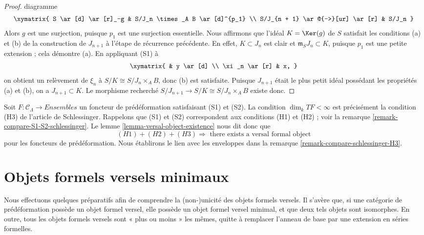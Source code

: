 \begin{proof}
diagramme
$$
\xymatrix{
S \ar[d] \ar[r]_-g  &  S/J_n \times_A B \ar[d]^{p_1} \\
S/J_{n + 1} \ar@{-->}[ur] \ar[r] &  S/J_n
}
$$
Alors $g$ est une surjection, puisque $p_1$ est une surjection essentielle.
Nous affirmons que l'idéal $K = \Ker(g)$ de $S$ satisfait les conditions (a)
et (b) de la construction de $J_{n + 1}$ à l'étape de récurrence précédente.
En effet, $K \subset J_n$ est clair et
$\mathfrak m_SJ_n \subset K$, puisque $p_1$ est une petite extension ; cela
démontre (a). En appliquant (S1) à
$$
\xymatrix{
            &  y \ar[d] \\
\xi_n \ar[r]  &  x,
}
$$
on obtient un relèvement de $\xi_n$ à
$S/K \cong S/J_n \times_A B$, donc (b) est satisfaite. Puisque $J_{n + 1}$
était le plus petit idéal possédant les propriétés (a) et (b), on a
$J_{n + 1} \subset K$. Le morphisme recherché
$S/J_{n+1} \to S/K \cong S/J_n \times_A B$ existe donc.
\end{proof}

\begin{remark}
\label{remark-compare-schlessinger-H3-pre}
Soit $F : \mathcal{C}_\Lambda \to \textit{Ensembles}$ un foncteur de
prédéformation satisfaisant (S1) et (S2). La condition
$\dim_k TF < \infty$ est précisément la condition (H3) de l'article de
Schlessinger. Rappelons que (S1) et (S2) correspondent aux conditions (H1) et
(H2) ; voir la remarque \ref{remark-compare-S1-S2-schlessinger}. Le lemme
\ref{lemma-versal-object-existence} nous dit donc que
$$
(H1) + (H2) + (H3)
\Rightarrow
\text{ there exists a versal formal object}
$$
pour les foncteurs de prédéformation. Nous établirons le lien avec les
enveloppes dans la remarque \ref{remark-compare-schlessinger-H3}.
\end{remark}





\section{Objets formels versels minimaux}
\label{section-minimal-versal}

\noindent
Nous effectuons quelques préparatifs afin de comprendre la (non-)unicité des
objets formels versels. Il s'avère que, si une catégorie de prédéformation
possède un objet formel versel, elle possède un objet formel versel minimal,
et que deux tels objets sont isomorphes. En outre, tous les objets formels
versels sont « plus ou moins » les mêmes, quitte à remplacer l'anneau de base
par une extension en séries formelles.

